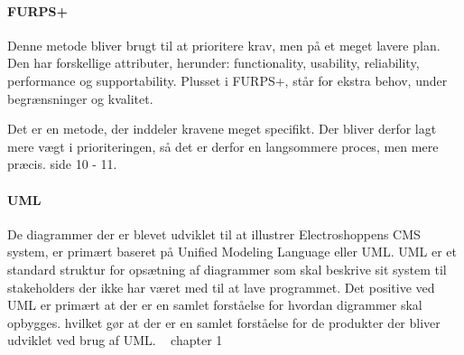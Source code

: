 \paragraph{FURPS+}
Denne metode bliver brugt til at prioritere krav, men på et meget lavere plan. Den har forskellige attributer, herunder: functionality, usability, reliability, performance og supportability.
Plusset i FURPS+, står for ekstra behov, under begrænsninger og kvalitet.

Det er en metode, der inddeler kravene meget specifikt. Der bliver derfor lagt mere vægt i prioriteringen, så det er derfor en langsommere proces, men mere præcis. \cite{A&NSupplements} side 10 - 11.

\paragraph{UML}
De diagrammer der er blevet udviklet til at illustrer Electroshoppens CMS system, er primært baseret på Unified Modeling Language eller UML. UML er et standard struktur for opsætning af diagrammer som skal beskrive sit system til stakeholders der ikke har været med til at lave programmet. 
Det positive ved UML er primært at der er en samlet forståelse for hvordan digrammer skal opbygges. hvilket gør at der er en samlet forståelse for de produkter der bliver udviklet ved brug af UML. ~\cite{A&N} chapter 1
 

\endgroup